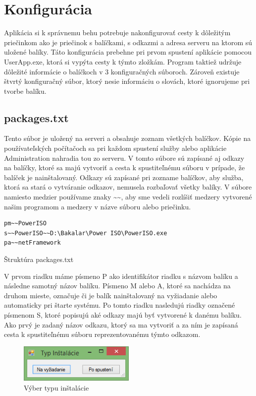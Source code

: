 \section{Konfigurácia}
Aplikácia si k správnemu behu potrebuje nakonfigurovať cesty k dôležitým priečinkom ako je priečinok s balíčkami, s odkazmi a adresa serveru na ktorom sú uložené balíky. Táto konfigurácia prebehne pri prvom spustení aplikácie pomocou UserApp.exe, ktorá si vypýta cesty k týmto zložkám. Program taktiež udržuje dôležité informácie o balíčkoch v 3 konfiguračných súboroch. Zároveň existuje štvrtý konfiguračný súbor, ktorý nesie informáciu o slovách, ktoré ignorujeme pri tvorbe balíku.

\subsection{packages.txt}
Tento súbor je uložený na serveri a obsahuje zoznam všetkých balíčkov. Kópie na používateľských počítačoch sa pri každom spustení služby alebo aplikácie Administration nahradia tou zo serveru. V tomto súbore sú zapísané aj odkazy na balíčky, ktoré sa majú vytvoriť a cesta k spustiteľnému súboru v prípade, že balíček je nainštalovaný. Odkazy sú zapísané pri zozname balíčkov, aby služba, ktorá sa stará o vytváranie odkazov, nemusela rozbaľovať všetky balíky. V súbore namiesto medzier používame znaky \textasciitilde\textasciitilde, aby sme vedeli rozlíšiť medzery vytvorené našim programom a medzery v názve súboru alebo priečinku.
\begin{listing}
\begin{verbatim}  
pm~~PowerISO
s~~PowerISO~~D:\Bakalar\Power ISO\PowerISO.exe
pa~~netFramework
\end{verbatim}
\caption{Štruktúra packages.txt}
\label{lst:pack}
\end{listing}
V prvom riadku máme písmeno P ako identifikátor riadku s názvom balíku a následne samotný názov balíku. Písmeno M alebo A, ktoré sa nachádza na druhom mieste, označuje či je balík nainštalovaný na vyžiadanie alebo automaticky pri štarte systému. Po tomto riadku nasledujú riadky označené písmenom S, ktoré popisujú aké odkazy majú byť vytvorené k danému balíku. Ako prvý je zadaný názov odkazu, ktorý sa ma vytvoriť a za ním je zapísaná cesta k spustiteľnému súboru reprezentovanému týmto odkazom.
\begin{figure}[h]
    \centering
    \includegraphics[width=0.5\textwidth]{installtype}
    \caption{Výber typu inštalácie}
    \label{fig:installtype}
\end{figure}

